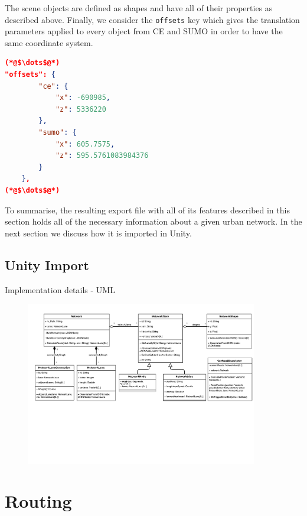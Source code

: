 The scene objects are defined as shapes and have all of their properties as described above. Finally, we consider the \texttt{offsets} key which gives the translation parameters applied to every object from CE and SUMO in order to have the same coordinate system. \\

    \begin{scriptsize}
        \begin{lstlisting}[language=json,firstnumber=1,caption={General overview of the offsets key in the JSON export format.},label={lis:format-node}]
(*@$\dots$@*)
"offsets": {
        "ce": {
            "x": -690985,
            "z": 5336220
        },
        "sumo": {
            "x": 605.7575,
            "z": 595.5761083984376
        }
    },
(*@$\dots$@*)
	   \end{lstlisting}
    \end{scriptsize}
    
To summarise, the resulting export file with all of its features described in this section holds all of the necessary information about a given urban network. In the next section we discuss how it is imported in Unity.

\section{Unity Import}

Implementation details - UML
\begin{figure}[htb]
	\centering
	\includegraphics[width=0.9\textwidth]{figures/unity-uml}
	\label{fig:unity-uml}
	\caption{}
\end{figure}

\chapter{Routing}
\label{ch:gps}

